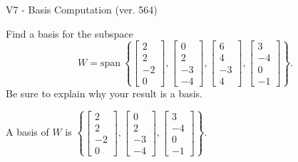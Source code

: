 \begin{exercise}
  \begin{exerciseTitle}V7 - Basis Computation (ver. 564)\end{exerciseTitle}
  \begin{exerciseStatement}
    Find a basis for the subspace 
\[W=\mathrm{span}\ \left\{\left[\begin{array}{r}
2 \\
2 \\
-2 \\
0
\end{array}\right] , \left[\begin{array}{r}
0 \\
2 \\
-3 \\
-4
\end{array}\right] , \left[\begin{array}{r}
6 \\
4 \\
-3 \\
4
\end{array}\right] , \left[\begin{array}{r}
3 \\
-4 \\
0 \\
-1
\end{array}\right]\right\}.\]
 Be sure to explain why your result is a basis.


  \end{exerciseStatement}
  \begin{exerciseAnswer}
   A basis of \(W\) is  \(\left\{\left[\begin{array}{r}
2 \\
2 \\
-2 \\
0
\end{array}\right] , \left[\begin{array}{r}
0 \\
2 \\
-3 \\
-4
\end{array}\right] , \left[\begin{array}{r}
3 \\
-4 \\
0 \\
-1
\end{array}\right]\right\}\).
  


  \end{exerciseAnswer}
\end{exercise}